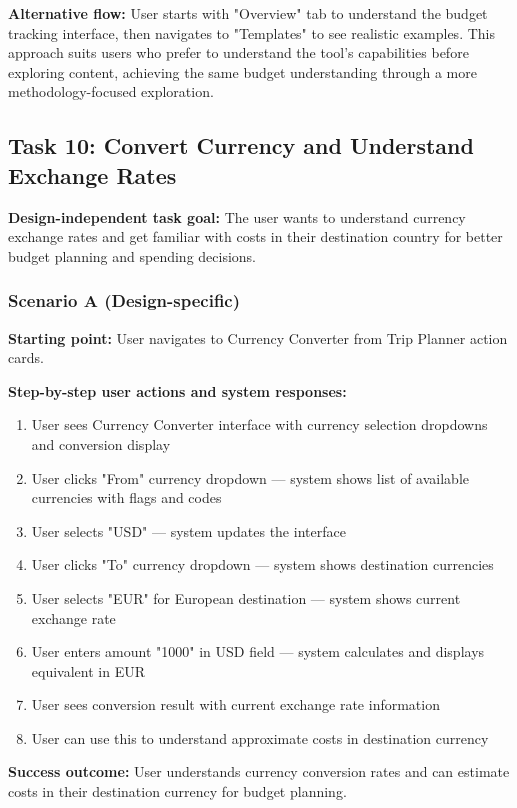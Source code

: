 \documentclass[11pt,a4paper]{article}
\begin{document}
\textbf{Alternative flow:} User starts with "Overview" tab to understand the budget tracking interface, then navigates to "Templates" to see realistic examples. This approach suits users who prefer to understand the tool's capabilities before exploring content, achieving the same budget understanding through a more methodology-focused exploration.

\subsection*{Task 10: Convert Currency and Understand Exchange Rates}

\textbf{Design-independent task goal:}
The user wants to understand currency exchange rates and get familiar with costs in their destination country for better budget planning and spending decisions.

\subsubsection*{Scenario A (Design-specific)}

\textbf{Starting point:} User navigates to Currency Converter from Trip Planner action cards.

\textbf{Step-by-step user actions and system responses:}
\begin{enumerate}
\item User sees Currency Converter interface with currency selection dropdowns and conversion display
\item User clicks "From" currency dropdown — system shows list of available currencies with flags and codes
\item User selects "USD" — system updates the interface
\item User clicks "To" currency dropdown — system shows destination currencies
\item User selects "EUR" for European destination — system shows current exchange rate
\item User enters amount "1000" in USD field — system calculates and displays equivalent in EUR
\item User sees conversion result with current exchange rate information
\item User can use this to understand approximate costs in destination currency
\end{enumerate}

\textbf{Success outcome:} User understands currency conversion rates and can estimate costs in their destination currency for budget planning.
\end{document}
